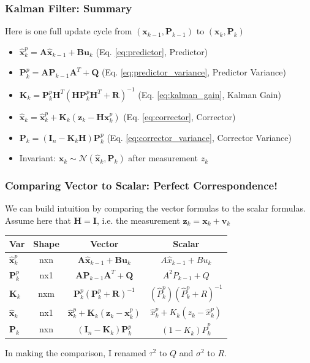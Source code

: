 \documentclass{beamer}
\renewcommand{\vec}[1]{\mathbf{#1}}
\newcommand{\vx}{\vec{x}}
\newcommand{\vz}{\vec{z}}
\newcommand{\vv}{\vec{v}}
\newcommand{\vu}{\vec{u}}
\newcommand{\vA}{\vec{A}}
\newcommand{\vB}{\vec{B}}
\newcommand{\vP}{\vec{P}}
\newcommand{\vK}{\vec{K}}
\newcommand{\vH}{\vec{H}}
\newcommand{\vQ}{\vec{Q}}
\newcommand{\vR}{\vec{R}}
\newcommand{\N}{\mathcal{N}}
\newcommand{\xh}{\hat{x}}
\newcommand{\Ph}{\hat{P}}
\newcommand{\vxh}{\hat{\vx}}
\newcommand{\Id}{\vec{I}}
\begin{document}
\begin{frame}
\frametitle{Kalman Filter: Summary}
Here is one full update cycle from $(\vx_{k-1},\vP_{k-1})$ to $(\vx_{k}, \vP_{k})$
\begin{itemize}
\item $\vxh_{k}^p = \vA \vxh_{k-1} + \vB \vu_k$ 
\hspace{10em}(Eq. \ref{eq:predictor}, Predictor)
\item $\vP_k^p =\vA \vP_{k-1} \vA^T + \vQ$ 
\hspace{5em}(Eq. \ref{eq:predictor_variance}, Predictor Variance)
\item $\vK_k = \vP_k^p \vH^T \left( \vH \vP_k^p \vH^T +\vR \right)^{-1}$ 
\hspace{3.2em}(Eq. \ref{eq:kalman_gain}, Kalman Gain)
\item $\vxh_k = \vxh_k^p + \vK_k (\vz_k - \vH \vx_k^p)$ 
\hspace{7em}(Eq. \ref{eq:corrector}, Corrector)
\item $\vP_k = (\Id_n - \vK_k \vH) \vP_k^p$ 
\hspace{5em}(Eq. \ref{eq:corrector_variance}, Corrector Variance)
\item Invariant: $\vx_k \sim \N(\vxh_k, \vP_k)$ after measurement $z_k$
\end{itemize}
\end{frame}

\begin{frame}
\frametitle{Comparing Vector to Scalar: Perfect Correspondence!}
We can build intuition by comparing the vector formulas to the scalar formulas.\\
Assume here that $\vH = \Id$, i.e. the measurement $\vz_k = \vx_k + \vv_k$
\begin{center}
\begin{tabular}{|l |c| c | c |}
\hline
Var & Shape & Vector & Scalar \\ \hline
$\vxh_{k}^p$ & nxn & $\vA \vxh_{k-1} + \vB \vu_k$ & $A \xh_{k-1} + B u_k$ \\[3pt]  
$\vP_k^p$ & nx1 & $\vA \vP_{k-1} \vA^T + \vQ$  & $A^2 P_{k-1} + Q$ \\[3pt] 
$\vK_k$  & nxm & $\vP_k^p \left( \vP_k^p +\vR \right)^{-1}$ & $(\Ph_{k}^p)(\Ph_{k}^p + R)^{-1}$ \\[3pt] 
$\vxh_k$ & nx1 & $ \vxh_k^p + \vK_k (\vz_k - \vx_k^p)$ & $ \xh_{k}^p + K_{k} (z_{k} - \xh_{k}^p)$ \\[3pt] 
$\vP_k$  & nxn & $(\Id_n - \vK_k) \vP_k^p$  & $ (1-K_{k}) \Ph_{k}^p$ \\[3pt] \hline
\end{tabular}
\end{center}
In making the comparison, I renamed $\tau^2$ to $Q$ and $\sigma^2$ to $R$.


\end{frame}
\end{document}
